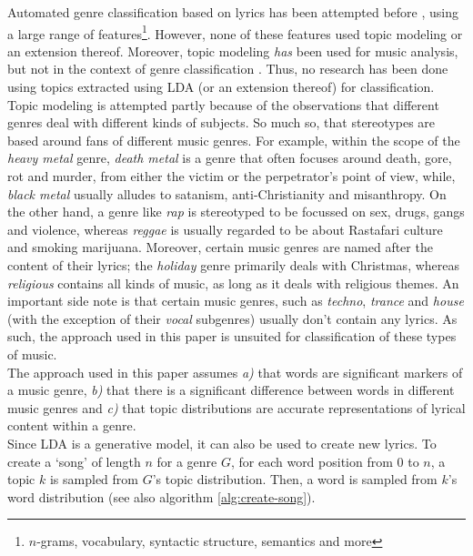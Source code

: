 
Automated genre classification based on lyrics has been attempted before \cite{fell lyrics}, using a large range of features\footnote{$n$-grams, vocabulary, syntactic structure, semantics and more}. However, none of these features used topic modeling or an extension thereof. Moreover, topic modeling \textit{has} been used for music analysis, but not in the context of genre classification \cite{lukiccomparison}. Thus, no research has been done using topics extracted using LDA (or an extension thereof) for classification. \\
Topic modeling is attempted partly because of the observations that different genres deal with different kinds of subjects. So much so, that stereotypes are based around fans of different music genres. For example, within the scope of the \textit{heavy metal} genre, \textit{death metal} is a genre that often focuses around death, gore, rot and murder, from either the victim or the perpetrator's point of view, while, \textit{black metal} usually alludes to satanism, anti-Christianity and misanthropy. On the other hand, a genre like \textit{rap} is stereotyped to be focussed on sex, drugs, gangs and violence, whereas \textit{reggae} is usually regarded to be about Rastafari culture and smoking marijuana. Moreover, certain music genres are named after the content of their lyrics; the \textit{holiday} genre primarily deals with Christmas, whereas \textit{religious} contains all kinds of music, as long as it deals with religious themes. An important side note is that certain music genres, such as \textit{techno}, \textit{trance} and \textit{house} (with the exception of their \textit{vocal} subgenres) usually don't contain any lyrics. As such, the approach used in this paper is unsuited for classification of these types of music. \\
The approach used in this paper assumes \textit{a)} that words are significant markers of a music genre, \textit{b)} that there is a significant difference between words in different music genres and \textit{c)} that topic distributions are accurate representations of lyrical content within a genre. \\
Since LDA is a generative model, it can also be used to create new lyrics. To create a `song' of length $n$ for a genre $G$, for each word position from $0$ to $n$, a topic $k$ is sampled from $G$'s topic distribution. Then, a word is sampled from $k$'s word distribution (see also algorithm \ref{alg:create-song}). \\
